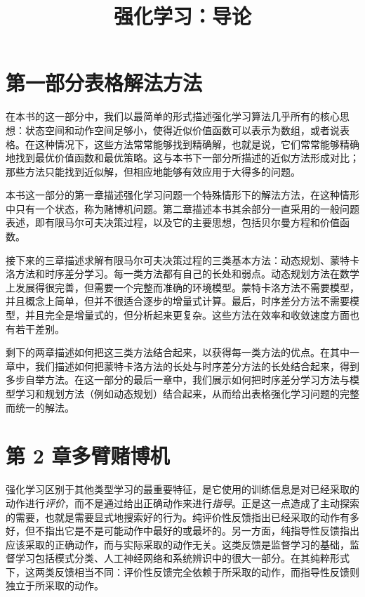 \documentclass[UTF8, 12pt, fontset=fandol, oneside]{ctexart}
\title{强化学习：导论}
\author{}
\date{}
\begin{document}
\maketitle

\section*{第一部分\quad 表格解法方法}

在本书的这一部分中，我们以最简单的形式描述强化学习算法几乎所有的核心思想：状态空间和动作空间足够小，使得近似价值函数可以表示为数组，或者说表格。在这种情况下，这些方法常常能够找到精确解，也就是说，它们常常能够精确地找到最优价值函数和最优策略。这与本书下一部分所描述的近似方法形成对比；那些方法只能找到近似解，但相应地能够有效应用于大得多的问题。

本书这一部分的第一章描述强化学习问题一个特殊情形下的解法方法，在这种情形中只有一个状态，称为赌博机问题。第二章描述本书其余部分一直采用的一般问题表述，即有限马尔可夫决策过程，以及它的主要思想，包括贝尔曼方程和价值函数。

接下来的三章描述求解有限马尔可夫决策过程的三类基本方法：动态规划、蒙特卡洛方法和时序差分学习。每一类方法都有自己的长处和弱点。动态规划方法在数学上发展得很完善，但需要一个完整而准确的环境模型。蒙特卡洛方法不需要模型，并且概念上简单，但并不很适合逐步的增量式计算。最后，时序差分方法不需要模型，并且完全是增量式的，但分析起来更复杂。这些方法在效率和收敛速度方面也有若干差别。

剩下的两章描述如何把这三类方法结合起来，以获得每一类方法的优点。在其中一章中，我们描述如何把蒙特卡洛方法的长处与时序差分方法的长处结合起来，得到多步自举方法。在这一部分的最后一章中，我们展示如何把时序差分学习方法与模型学习和规划方法（例如动态规划）结合起来，从而给出表格强化学习问题的完整而统一的解法。

\section*{第 2 章\quad 多臂赌博机}

强化学习区别于其他类型学习的最重要特征，是它使用的训练信息是对已经采取的动作进行\emph{评价}，而不是通过给出正确动作来进行\emph{指导}。正是这一点造成了主动探索的需要，也就是需要显式地搜索好的行为。纯评价性反馈指出已经采取的动作有多好，但不指出它是不是可能动作中最好的或最坏的。另一方面，纯指导性反馈指出应该采取的正确动作，而与实际采取的动作无关。这类反馈是监督学习的基础，监督学习包括模式分类、人工神经网络和系统辨识中的很大一部分。在其纯粹形式下，这两类反馈相当不同：评价性反馈完全依赖于所采取的动作，而指导性反馈则独立于所采取的动作。
\end{document}
